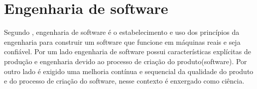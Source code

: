 
\section{Engenharia de software}

Segundo \cite{van2008software}, engenharia de software é o estabelecimento e uso dos princípios da engenharia para construir um software que funcione em máquinas reais e seja confiável. Por um lado engenharia de software possui características explícitas de produção e engenharia devido ao processo de criação do produto(software). Por outro lado é exigido uma melhoria contínua e sequencial da qualidade do produto e do processo de criação do software, nesse contexto é enxergado como ciência\cite{travassos2002introducao}.



